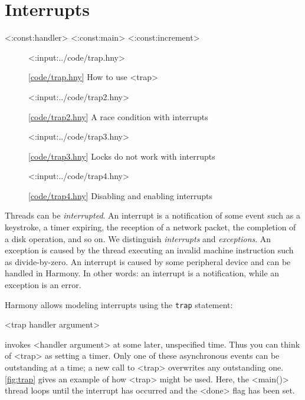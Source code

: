 \documentclass{report}
\newcommand{\harmonylink}[1]{%
[\href{https://harmony.cs.cornell.edu/#1}{\underline{#1}}]%
}
\newenvironment{code}{
\tcolorbox
}{
\endtcolorbox
}
\begin{document}
\chapter{Interrupts}
\label{ch:interrupts}

<{:const:handler}>
<{:const:main}>
<{:const:increment}>

\begin{figure}
\begin{code}
<{:input:../code/trap.hny}>
\end{code}
\caption{\harmonylink{code/trap.hny} How to use <{trap}>}
\label{fig:trap}
\end{figure}

\begin{figure}
\begin{code}
<{:input:../code/trap2.hny}>
\end{code}
\caption{\harmonylink{code/trap2.hny} A race condition with interrupts}
\label{fig:trap2}
\end{figure}

\begin{figure}
\begin{code}
<{:input:../code/trap3.hny}>
\end{code}
\caption{\harmonylink{code/trap3.hny} Locks do not work with interrupts}
\label{fig:trap3}
\end{figure}

\begin{figure}
\begin{code}
<{:input:../code/trap4.hny}>
\end{code}
\caption{\harmonylink{code/trap4.hny} Disabling and enabling interrupts}
\label{fig:trap4}
\end{figure}

Threads can be \emph{interrupted}.  An interrupt is a notification
of some event such as a keystroke, a timer expiring, the reception
of a network packet, the completion of a disk operation, and so on.
We distinguish \emph{interrupts} and \emph{exceptions}.  An exception
is caused by the thread executing an invalid machine instruction
such as divide-by-zero.  An interrupt is caused by some peripheral
device and can be handled in Harmony.  In other words: an interrupt
is a notification, while an exception is an error.  

Harmony allows modeling interrupts using the \texttt{trap} statement:
\begin{code}
<{trap handler argument}>
\end{code}
invokes <{handler argument}> at some later, unspecified time.
Thus you can think of <{trap}> as setting a timer.
Only one of these asynchronous events can be outstanding at a time;
a new call to <{trap}> overwrites any outstanding one.
\autoref{fig:trap} gives an example of how <{trap}> might be used.
Here, the <{main()}> thread loops until the interrupt has occurred and
the <{done}> flag has been set.
\end{document}
